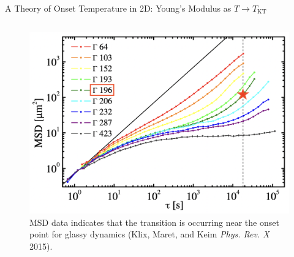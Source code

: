 \begin{frame}{A Theory of Onset Temperature in 2D: Young's Modulus as $T \to T_\mathrm{KT}$}
\begin{columns}
\begin{column}[T]{0.425\textwidth}
\begin{figure}
\begin{overprint}
\vspace{20pt}\centering\includegraphics[width=\linewidth]{c.13-kt_keim_1/msd_keim_1.png}\caption{MSD data indicates that the transition is occurring near the onset point for glassy dynamics  (Klix, Maret, and Keim \textit{Phys. Rev. X} 2015).}



\end{overprint}
\end{figure}
\end{column}
\end{columns}
\end{frame}
